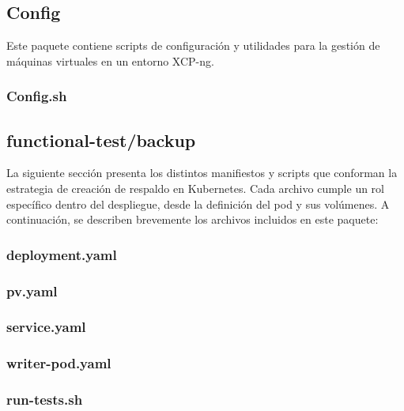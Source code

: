 \subsection{Config}
\noindent
Este paquete contiene scripts de configuración y utilidades para la gestión de máquinas virtuales en un entorno XCP-ng.
\subsubsection{Config.sh}
\noindent


\subsection{functional-test/backup}
\noindent
La siguiente sección presenta los distintos manifiestos y scripts que conforman la estrategia de creación de respaldo en Kubernetes. Cada archivo cumple un rol específico dentro del despliegue, desde la definición del pod y sus volúmenes. A continuación, se describen brevemente los archivos incluidos en este paquete:
\subsubsection{deployment.yaml}
\noindent

\subsubsection{pv.yaml}
\noindent

\subsubsection{service.yaml}
\noindent

\subsubsection{writer-pod.yaml}
\noindent

\subsubsection{run-tests.sh}
\noindent



